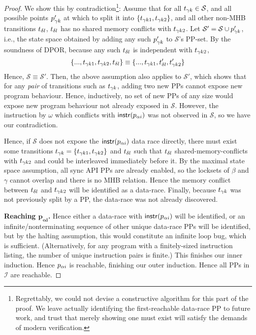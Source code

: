 \begin{proof}
We show this by contradiction\footnote{
Regrettably, we could not devise a constructive algorithm for this part of the proof.
We leave actually identifying the first-reachable data-race PP to future work,
and trust that merely showing one must exist will satisfy the demands of modern verification.}:
%
Assume that for all $t_{\gamma{}k} \in \mathcal{S}$,
and all possible points $p_{\gamma{}k}'$ at which to split it into $\{t_{\gamma{}k1},t_{\gamma{}k2}\}$,
and all other non-MHB transitions $t_{\delta{}l}$,
$t_{\delta{}l}$ has no shared memory conflicts with $t_{\gamma{}k2}$.
%
Let $\mathcal{S}' = \mathcal{S} \cup p_{\gamma{}k}'$, i.e., the state space obtained by adding any such $p_{\gamma{}k}'$ to $\mathcal{S}$'s PP-set.
By the soundness of DPOR, because any such $t_{\delta{}l}$ is independent with $t_{\gamma{}k2}$,
\[
	\{..., t_{\gamma{}k1}, t_{\gamma{}k2}, t_{\delta{}l}\}
	\equiv
	\{..., t_{\gamma{}k1}, t_{\delta{}l}', t_{\gamma{}k2}'\}
\]
Hence, $\mathcal{S} \equiv \mathcal{S}'$. %
Then, the above assumption also applies to $\mathcal{S}'$,
which shows that for any {\em pair} of transitions such as $t_{\gamma{}k}$, adding two new PPs cannot expose new program behaviour.
Hence, inductively, no set of new PPs of any size would expose new program behaviour not already exposed in $\mathcal{S}$.
However, the instruction by $\omega$ which conflicts with $\mathsf{instr}(p_{\alpha{}i})$ was not observed in $\mathcal{S}$,
so we have our contradiction.

Hence, if $\mathcal{S}$ does not expose the $\mathsf{instr}(p_{\alpha{}i})$ data race directly,
there must exist some transitions $t_{\gamma{}k} = \{t_{\gamma{}k1},t_{\gamma{}k2}\}$ and $t_{\delta{}l}$ such that $t_{\delta{}l}$ shared-memory-conflicts with $t_{\gamma{}k2}$ and could be interleaved immediately before it.
By the maximal state space assumption, all sync API PPs are already enabled, so the locksets of $\beta$ and $\gamma$ cannot overlap and there is no MHB relation.
Hence the memory conflict between $t_{\delta{}l}$ and $t_{\gamma{}k2}$ will be identified as a data-race.
Finally, because $t_{\gamma{}k}$ was not previously split by a PP, the data-race was not already discovered.

{\bf Reaching $\mathbf{p_{\alpha{}i}}$.}
Hence either a data-race with $\mathsf{instr}(p_{\alpha{}i})$ will be identified,
or an infinite/nonterminating sequence of other unique data-race PPs will be identified,
but by the halting assumption, this would constitute an infinite loop bug, which is sufficient.
(Alternatively, for any program with a finitely-sized instruction listing, the number of unique instruction pairs is finite.)
This finishes our inner induction.
Hence $p_{\alpha{}i}$ is reachable, finishing our outer induction.
Hence all PPs in $\mathcal{I}$ are reachable.
\end{proof}

